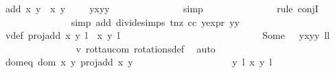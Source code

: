 \begin{isabellebody}
\ {\isachardoublequoteopen}add\ {\isacharparenleft}x{\isacharcomma}\ y{\isacharparenright}\ {\isacharparenleft}{\isasymtau}\ {\isacharparenleft}x{\isacharprime}{\isacharcomma}\ y{\isacharprime}{\isacharparenright}{\isacharparenright}\ {\isacharequal}\ {\isacharparenleft}{\isasymrho}\ {\isasymcirc}\ {\isasymtau}{\isacharparenright}\ {\isacharparenleft}y{\isacharasterisk}x{\isacharprime}{\isacharcomma}y{\isacharasterisk}y{\isacharprime}{\isacharparenright}{\isachardoublequoteclose}\isanewline
\ \ \ \ \ \ \ \ \ \ \ \ \ \ \isamarkupfalse%
{\isacharparenleft}simp{\isacharparenright}\isanewline
\ \ \ \ \ \ \ \ \ \ \ \ \ \ \isamarkupfalse%
{\isacharparenleft}rule\ conjI{\isacharparenright}\isanewline
\ \ \ \ \ \ \ \ \ \ \ \ \ \ \isamarkupfalse%
{\isacharparenleft}simp\ add{\isacharcolon}\ divide{\isacharunderscore}simps\ t{\isacharunderscore}nz\ cc\ y{\isacharunderscore}expr\ {\isacartoucheopen}y{\isacharasterisk}y\ {\isacharequal}\ {}{\isacartoucheclose}{\isacharparenright}{\isacharplus}\isanewline
\ \ \ \ \ \ \ \ \ \ \ \ \isamarkupfalse%
\ \isamarkupfalse%
\ v{}{\isacharunderscore}def{\isacharcolon}\ {\isachardoublequoteopen}proj{\isacharunderscore}add\ {\isacharparenleft}{\isacharparenleft}x{\isacharcomma}\ y{\isacharparenright}{\isacharcomma}\ l{\isacharparenright}\ {\isacharparenleft}{\isasymtau}\ {\isacharparenleft}x{\isacharprime}{\isacharcomma}\ y{\isacharprime}{\isacharparenright}{\isacharcomma}\ l{\isacharprime}\ {\isacharplus}\ {}{\isacharparenright}\ {\isacharequal}\isanewline
\ \ \ \ \ \ \ \ \ \ \ \ \ \ \ \ \ \ \ \ \ \ \ \ \ \ Some\ {\isacharparenleft}{\isasymtau}\ {\isacharparenleft}{\isasymrho}\ {\isacharparenleft}y{\isacharasterisk}x{\isacharprime}{\isacharcomma}y{\isacharasterisk}y{\isacharprime}{\isacharparenright}{\isacharparenright}{\isacharcomma}\ l{\isacharplus}l{\isacharprime}{\isacharplus}{}{\isacharparenright}{\isachardoublequoteclose}\isanewline
\ \ \ \ \ \ \ \ \ \ \ \ \ \ \isamarkupfalse%
\ v{}\ rot{\isacharunderscore}tau{\isacharunderscore}com\ rotations{\isacharunderscore}def\ \isamarkupfalse%
\ auto\isanewline
\ \ \ \ \ \ \ \ \ \ \ \ \isamarkupfalse%
\ dom{\isacharunderscore}eq{\isacharcolon}\ {\isachardoublequoteopen}{\isacharparenleft}dom\ {\isacharparenleft}{\isasymlambda}{\isacharparenleft}x{\isacharcomma}\ y{\isacharparenright}{\isachardot}\ proj{\isacharunderscore}add\ x\ y{\isacharparenright}\ {\isasyminter}\isanewline
\ \ \ \ \ \ \ \ \ \ \ \ \ \ \ \ \ \ {\isacharbraceleft}{\isacharparenleft}{\isacharparenleft}{\isacharparenleft}{}{\isacharcomma}\ y{\isacharparenright}{\isacharcomma}\ l{\isacharparenright}{\isacharcomma}\ {\isacharparenleft}x{\isacharprime}{\isacharcomma}\ y{\isacharprime}{\isacharparenright}{\isacharcomma}\ l{\isacharprime}{\isacharparenright}{\isacharcomma}\isanewline

\end{isabellebody}
